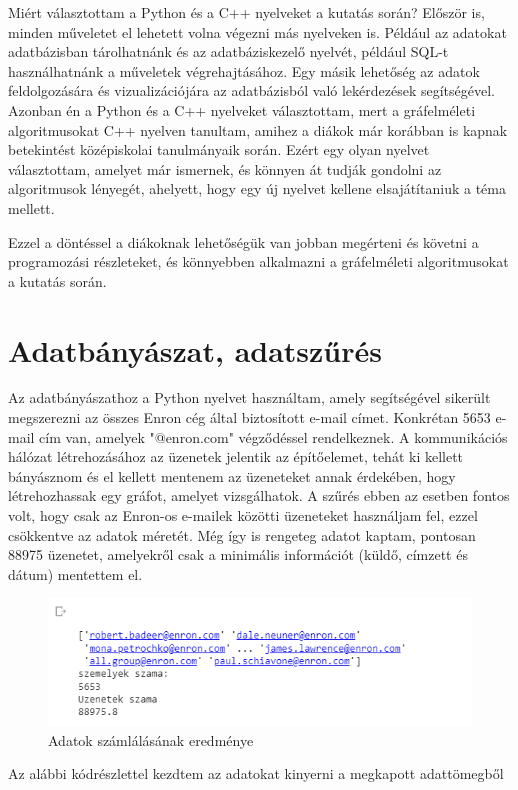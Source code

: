 Miért választottam a Python és a C++ nyelveket a kutatás során? Először is, minden műveletet el lehetett volna végezni más nyelveken is. Például az adatokat adatbázisban tárolhatnánk és az adatbáziskezelő nyelvét, például SQL-t használhatnánk a műveletek végrehajtásához. Egy másik lehetőség az adatok feldolgozására és vizualizációjára az adatbázisból való lekérdezések segítségével. Azonban én a Python és a C++ nyelveket választottam, mert a gráfelméleti algoritmusokat C++ nyelven tanultam, amihez a diákok már korábban is kapnak betekintést középiskolai tanulmányaik során. Ezért egy olyan nyelvet választottam, amelyet már ismernek, és könnyen át tudják gondolni az algoritmusok lényegét, ahelyett, hogy egy új nyelvet kellene elsajátítaniuk a téma mellett.

Ezzel a döntéssel a diákoknak lehetőségük van jobban megérteni és követni a programozási részleteket, és könnyebben alkalmazni a gráfelméleti algoritmusokat a kutatás során.

\section {Adatbányászat, adatszűrés}


Az adatbányászathoz a Python nyelvet használtam, amely segítségével sikerült megszerezni az összes Enron cég által biztosított e-mail címet. Konkrétan 5653 e-mail cím van, amelyek "@enron.com" végződéssel rendelkeznek. A kommunikációs hálózat létrehozásához az üzenetek jelentik az építőelemet, tehát ki kellett bányásznom és el kellett mentenem az üzeneteket annak érdekében, hogy létrehozhassak egy gráfot, amelyet vizsgálhatok. A szűrés ebben az esetben fontos volt, hogy csak az Enron-os e-mailek közötti üzeneteket használjam fel, ezzel csökkentve az adatok méretét. Még így is rengeteg adatot kaptam, pontosan 88975 üzenetet, amelyekről csak a minimális információt (küldő, címzett és dátum) mentettem el.

\begin{figure}[h]
	\centering
	\includegraphics[scale=1]{images/adatokszama}
	\caption{Adatok számlálásának eredménye}
\end{figure}
\pagebreak%
 Az alábbi kódrészlettel kezdtem az adatokat kinyerni a megkapott adattömegből


